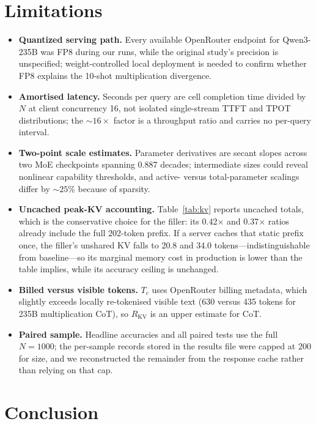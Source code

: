 \documentclass[11pt,a4paper]{article}
\begin{document}
\section{Limitations}
\label{sec:limitations}

\begin{itemize}
    \item \textbf{Quantized serving path.} Every available OpenRouter endpoint for
    Qwen3-235B was FP8 during our runs, while the original study's precision is
    unspecified; weight-controlled local deployment is needed to confirm whether
    FP8 explains the 10-shot multiplication divergence.
    \item \textbf{Amortised latency.} Seconds per query are cell completion time
    divided by $N$ at client concurrency 16, not isolated single-stream TTFT and
    TPOT distributions; the ${\sim}16\times$ factor is a throughput ratio and
    carries no per-query interval.
    \item \textbf{Two-point scale estimates.} Parameter derivatives are secant
    slopes across two MoE checkpoints spanning 0.887 decades; intermediate sizes
    could reveal nonlinear capability thresholds, and active- versus
    total-parameter scalings differ by ${\sim}25\%$ because of sparsity.
    \item \textbf{Uncached peak-KV accounting.} Table~\ref{tab:kv} reports
    uncached totals, which is the conservative choice for the filler: its
    0.42$\times$ and 0.37$\times$ ratios already include the full 202-token
    prefix. If a server caches that static prefix once, the filler's unshared KV
    falls to 20.8 and 34.0 tokens---indistinguishable from baseline---so its
    marginal memory cost in production is lower than the table implies, while its
    accuracy ceiling is unchanged.
    \item \textbf{Billed versus visible tokens.} $T_c$ uses OpenRouter billing
    metadata, which slightly exceeds locally re-tokenised visible text (630
    versus 435 tokens for 235B multiplication CoT), so $R_{\mathrm{KV}}$ is an
    upper estimate for CoT.
    \item \textbf{Paired sample.} Headline accuracies and all paired tests use the
    full $N{=}1000$; the per-sample records stored in the results file were
    capped at 200 for size, and we reconstructed the remainder from the response
    cache rather than relying on that cap.
\end{itemize}

\section{Conclusion}
\label{sec:conclusion}
\end{document}
